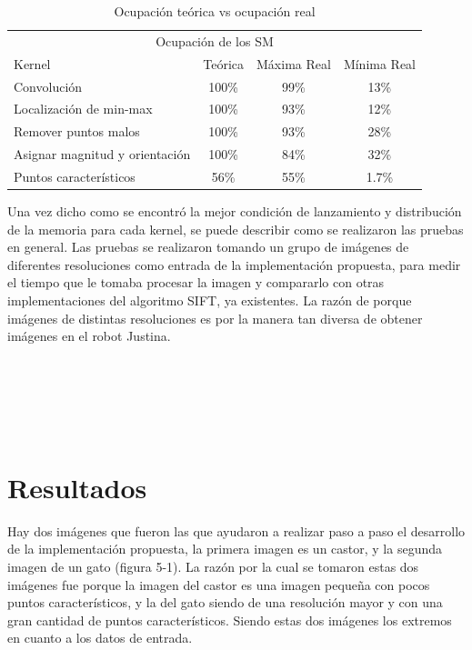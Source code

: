 \begin{table}[H]
\centering
\begin{tabular}{|l|c|c|c|}
\hline
\multicolumn{4}{|c|}{Ocupación de los SM} \\
\cline{1-4}
Kernel & Teórica &  Máxima Real &  Mínima Real\\
\hline \hline
 Convolución                    & 100\%   &  99\%   &   13\%                     \\ \cline{1-4}
 Localización de min-max        & 100\%   &  93\%   &   12\% \\ \cline{1-4}
 Remover puntos malos           & 100\%   &  93\%   &   28\%                \\ \cline{1-4}
 Asignar magnitud y orientación & 100\%   &  84\%   &   32\%            \\ \cline{1-4}
 Puntos característicos         & 56\%    &  55\%   &   1.7\%           \\ \cline{1-4}
\end{tabular}
\caption{Ocupación teórica vs ocupación real}
\label{tabla:final}
\end{table}
Una vez dicho como se encontró la mejor condición de lanzamiento y distribución de la memoria para cada kernel, se puede describir como se realizaron las pruebas en general. Las pruebas se realizaron tomando un grupo de imágenes de diferentes resoluciones como entrada de la implementación propuesta, para medir el tiempo que le tomaba procesar la imagen y compararlo con otras implementaciones del algoritmo SIFT, ya existentes. La razón de porque imágenes de distintas resoluciones es por la manera tan diversa de obtener imágenes en el robot Justina.\\\\\\\\\\\\
\section{Resultados}
Hay dos imágenes que fueron las que ayudaron a realizar paso a paso el desarrollo de la implementación propuesta, la primera imagen es un castor, y la segunda imagen de un gato (figura 5-1). La razón por la cual se tomaron estas dos imágenes fue porque la imagen del castor es una imagen pequeña con pocos puntos característicos, y la del gato siendo de una resolución mayor y con una gran cantidad de puntos característicos. Siendo estas dos imágenes los extremos en cuanto a los datos de entrada.\\

